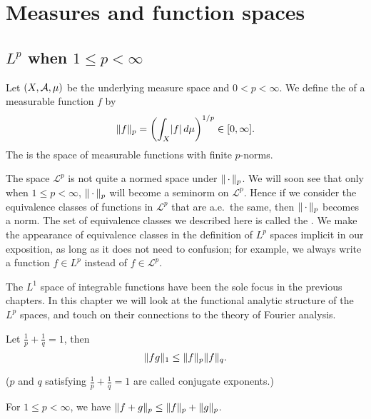 \chapter{Measures and function spaces} \label{chap:Leb-spaces}
\section{\texorpdfstring{$L^p$}{Lp} when \texorpdfstring{$1 \leq p < \infty$}{1 <= p < infinity}} \label{sec:Lp-1-infty}
Let $(X,\mathcal{A},\mu)$ be the underlying measure space and $0< p < \infty$. We define the  of a measurable function $f$ by \[
    \lVert f \rVert_{p} = \biggl(\int_X \lvert f \rvert\,d\mu\biggr)^{1/p} \in [0,\infty].
\] The  is the space of measurable functions with finite $p$-norms.

The space $\mathcal{L}^p$ is not quite a normed space under $\lVert \,\cdot\, \rVert_p$. We will soon see that only when $1 \leq p < \infty$, $\lVert \,\cdot\, \rVert_p$ will become a seminorm on $\mathcal{L}^p$. Hence if we consider the equivalence classes of functions in $\mathcal{L}^p$ that are a.e.\ the same, then $\lVert \,\cdot\, \rVert_p$ becomes a norm. The set of equivalence classes we described here is called the . We make the appearance of equivalence classes in the definition of $L^p$ spaces implicit in our exposition, as long as it does not need to confusion; for example, we always write a function $f \in L^p$ instead of $f \in \mathcal{L}^p$.

The $L^1$ space of integrable functions have been the sole focus in the previous chapters. In this chapter we will look at the functional analytic structure of the $L^p$ spaces, and touch on their connections to the theory of Fourier analysis.

\begin{namedthm} \label{thm:Holder-ineq}
    Let $\frac{1}{p} + \frac{1}{q} = 1$, then \[
        \lVert fg \rVert_1 \leq \lVert f \rVert_p\lVert f \rVert_q.
    \]

    ($p$ and $q$ satisfying $\frac{1}{p} + \frac{1}{q} = 1$ are called conjugate exponents.)
\end{namedthm}

\begin{namedthm} \label{thm:Minkowski-ineq}
    For $1 \leq p < \infty$, we have $\lVert f+g \rVert_p \leq \lVert f \rVert_p + \lVert g \rVert_p$.
\end{namedthm}

